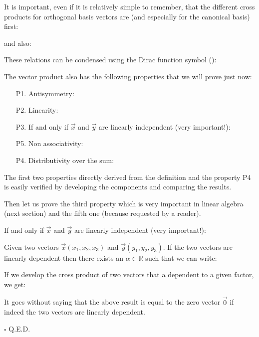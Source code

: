 	\pagebreak
	It is important, even if it is relatively simple to remember, that the different cross products for orthogonal basis vectors are (and especially for the canonical basis) first:
	
	and also:
	
	These relations can be condensed using the Dirac function symbol\label{orthogonal basis} ():
	
	The vector product also has the following properties that we will prove just now:
	  \begin{enumerate}
	  	\item[P1.] Antisymmetry:
	  		
	  		
	  	\item[P2.] Linearity\label{cross product linearity}:
	  		
	  		
	  	\item[P3.] If and only if $\vec{x}$ and $\vec{y}$ are linearly independent (very important!):
	  	
	  	
	  	\item[P5.] Non associativity:
	  	
	  	
	  	\item[P4.] Distributivity over the sum:
	  	
	  \end{enumerate}
	  The first two properties directly derived from the definition and the property P4 is easily verified by developing the components and comparing the results.
	  
	 Then let us prove the third property which is very important in linear algebra (next section) and the fifth one (because requested by a reader).
	\begin{theorem}
	If and only if $\vec{x}$ and $\vec{y}$ are linearly independent (very important!):
	
	\end{theorem}
	\begin{dem}
	Given two vectors $\vec{x}(x_1,x_2,x_3)$ and $\vec{y}(y_1,y_2,y_3)$. If the two vectors are linearly dependent then there exists an $\alpha \in \mathbb{R}$ such that we can write:
	
	If we develop the cross product of two vectors that a dependent to a given factor, we get:
	
	It goes without saying that the above result is equal to the zero vector $\vec{0}$ if indeed the two vectors are linearly dependent.
	\begin{flushright}
		$\square$  Q.E.D.
	\end{flushright}
	\end{dem}
	
